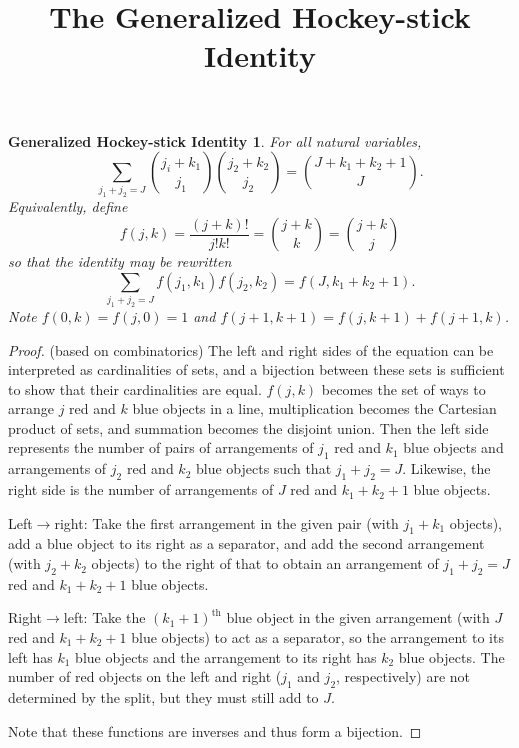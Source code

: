\documentclass{article}
\begin{document}
\title{The Generalized Hockey-stick Identity}
\maketitle

\newtheorem*{GHSI}{Generalized Hockey-stick Identity}

\begin{GHSI}
  For all natural variables,
  \[\sum_{j_1+j_2=J}\binom{j_i+k_1}{j_1}\binom{j_2+k_2}{j_2} = \binom{J+k_1+k_2+1}{J}.\]
  Equivalently, define
  \[f(j, k) = \frac{(j+k)!}{j!k!} = \binom{j+k}{k} = \binom{j+k}{j}\]
  so that the identity may be rewritten 
  \[\sum_{j_1+j_2=J}f(j_1, k_1)f(j_2, k_2) = f(J, k_1+k_2+1).\]
  Note $f(0, k)=f(j, 0)=1$ and $f(j+1, k+1)=f(j, k+1)+f(j+1, k)$.
\end{GHSI}

\begin{proof}
  (based on combinatorics)
  The left and right sides of the equation can be interpreted as cardinalities of sets,
  and a bijection between these sets is sufficient to show that their cardinalities are equal.
  $f(j, k)$ becomes the set of ways to arrange $j$ red and $k$ blue objects in a line,
  multiplication becomes the Cartesian product of sets, and summation becomes the disjoint union.
  Then the left side represents the number of pairs of
  arrangements of $j_1$ red and $k_1$ blue objects and
  arrangements of $j_2$ red and $k_2$ blue objects
  such that $j_1+j_2=J$.
  Likewise, the right side is the number of arrangements of $J$ red and $k_1+k_2+1$ blue objects.

  Left$\rightarrow$right: Take the first arrangement in the given pair (with $j_1+k_1$ objects),
  add a blue object to its right as a separator,
  and add the second arrangement (with $j_2+k_2$ objects) to the right of that
  to obtain an arrangement of $j_1+j_2=J$ red and $k_1+k_2+1$ blue objects.

  Right$\rightarrow$left: Take the $(k_1+1)^{\text{th}}$ blue object in the given arrangement
  (with $J$ red and $k_1+k_2+1$ blue objects) to act as a separator,
  so the arrangement to its left has $k_1$ blue objects
  and the arrangement to its right has $k_2$ blue objects.
  The number of red objects on the left and right ($j_1$ and $j_2$, respectively)
  are not determined by the split, but they must still add to $J$.

  Note that these functions are inverses and thus form a bijection.
\end{proof}
\end{document}
